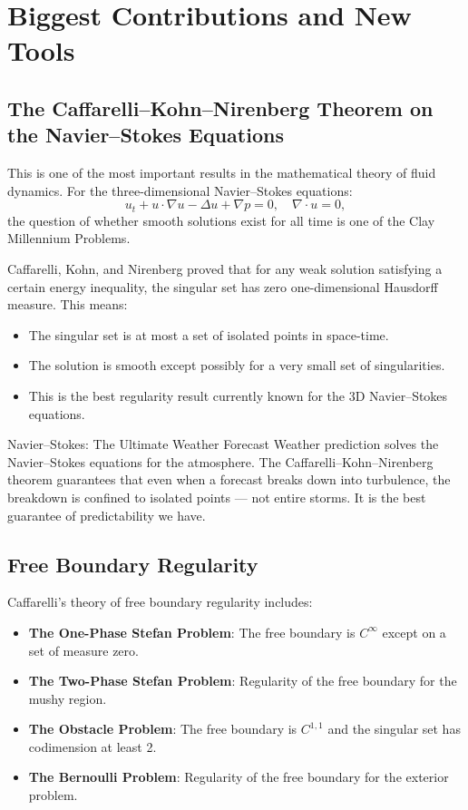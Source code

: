 \section{Biggest Contributions and New Tools}

\subsection{The Caffarelli--Kohn--Nirenberg Theorem on the Navier--Stokes Equations}

This is one of the most important results in the mathematical theory of fluid dynamics. For the three-dimensional Navier--Stokes equations:
\[
u_t + u \cdot \nabla u - \Delta u + \nabla p = 0,\quad \nabla \cdot u = 0,
\]
the question of whether smooth solutions exist for all time is one of the Clay Millennium Problems.

Caffarelli, Kohn, and Nirenberg proved that for any weak solution satisfying a certain energy inequality, the singular set has zero one-dimensional Hausdorff measure. This means:
\begin{itemize}
\item The singular set is at most a set of isolated points in space-time.
\item The solution is smooth except possibly for a very small set of singularities.
\item This is the best regularity result currently known for the 3D Navier--Stokes equations.
\end{itemize}

\begin{analogy}{Navier--Stokes: The Ultimate Weather Forecast}
Weather prediction solves the Navier--Stokes equations for the atmosphere. The Caffarelli--Kohn--Nirenberg theorem guarantees that even when a forecast breaks down into turbulence, the breakdown is confined to isolated points --- not entire storms. It is the best guarantee of predictability we have.
\end{analogy}

\subsection{Free Boundary Regularity}

Caffarelli's theory of free boundary regularity includes:
\begin{itemize}
\item \textbf{The One-Phase Stefan Problem}: The free boundary is $C^\infty$ except on a set of measure zero.
\item \textbf{The Two-Phase Stefan Problem}: Regularity of the free boundary for the mushy region.
\item \textbf{The Obstacle Problem}: The free boundary is $C^{1,1}$ and the singular set has codimension at least 2.
\item \textbf{The Bernoulli Problem}: Regularity of the free boundary for the exterior problem.
\end{itemize}

